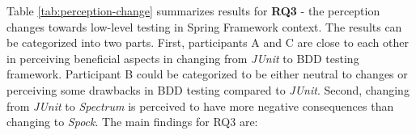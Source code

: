 {\renewcommand{\arraystretch}{1.3}
\begin{table}[H]
        \caption {Developer perception changes of low-level testing} \label{tab:perception-change}
\end{table}
}
\restoregeometry
Table \ref{tab:perception-change} summarizes results for \textbf{RQ3} - the perception changes towards low-level testing in Spring Framework context.
The results can be categorized into two parts. First, participants A and C are close to each other in perceiving beneficial
aspects in changing from \textit{JUnit} to BDD testing framework. Participant B could be categorized to be either neutral to changes
or perceiving some drawbacks in BDD testing compared to \textit{JUnit}. Second, changing from \textit{JUnit} to \textit{Spectrum} is perceived to have more negative consequences
than changing to \textit{Spock}. The main findings for RQ3 are:

